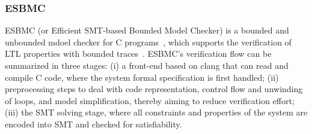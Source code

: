 \documentclass[10pt,conference]{IEEEtran}
\begin{document}
\subsubsection{ESBMC}
ESBMC (or Efficient SMT-based Bounded Model Checker) is a bounded and unbounded mdoel checker for C programs~\cite{esbmc2018}, which supports the verification of LTL properties with bounded traces~\cite{DBLP:journals/sosym/MorseCN015}. ESBMC's verification flow can be summarized in three stages: (i) a front-end based on clang that can read and compile C code, where the system formal specification is first handled; (ii) preprocessing steps to deal with code representation, control flow and unwinding of loops, and model simplification, thereby aiming to reduce verification effort; (iii) the SMT solving stage, where all constraints and properties of the system are encoded into SMT and checked for satisfiability. 
\end{document}

